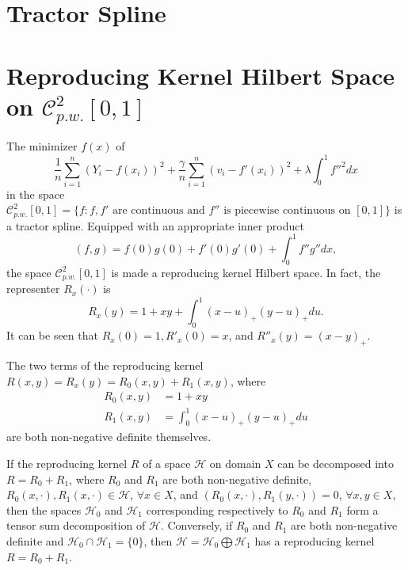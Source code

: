 \section{Tractor Spline}


\section{Reproducing Kernel Hilbert Space on $\mathcal{C}_{p.w.}^{2}[0,1]$}
The minimizer $f(x)$ of
\begin{equation}\label{maineq}
\frac{1}{n}\sum_{i=1}^{n}(Y_i-f(x_i))^2+\frac{\gamma}{n}\sum_{i=1}^{n}(v_i-f'(x_i))^2+\lambda \int_{0}^{1}f''^2dx
\end{equation}
in the space $\mathcal{C}_{p.w.}^{2}[0,1]=\{f:f,f' \mbox{ are continuous and } f'' \mbox{ is piecewise continuous on } [0,1] \}$ is a tractor spline. Equipped with an appropriate inner product
\begin{equation}
(f,g)=f(0) g(0)+f'(0) g'(0)+\int_{0}^{1}f''g''dx,
\end{equation}
the space $\mathcal{C}_{p.w.}^{2}[0,1]$ is made a reproducing kernel Hilbert space. In fact, the representer $R_x(\cdot)$ is 
\begin{equation}\label{kerneleq}
R_x(y)=1+xy+\int_{0}^{1} (x-u)_+(y-u)_+du.
\end{equation}
It can be seen that $R_x(0)=1, R'_x(0)=x$, and $R''_x(y)=(x-y)_+$.

The two terms of the reproducing kernel $R(x,y)=R_x(y)=R_0(x,y)+R_1(x,y)$, where
\begin{align}
R_0(x,y)&=1+xy \\
R_1(x,y)&=\int_{0}^{1} (x-u)_+(y-u)_+du
\end{align}
are both non-negative definite themselves.

\begin{theorem}
If the reproducing kernel $R$ of a space $\mathcal{H}$ on domain $X$ can be decomposed into $R = R_0+R_1$, where $R_0$ and $R_1$ are both non-negative definite, $R_0(x,\cdot), R_1(x,\cdot) \in \mathcal{H}$, $\forall x \in X$, and $(R_0(x, ·),R_1(y, ·)) = 0$, $\forall x, y \in X$, then the spaces $\mathcal{H}_0$ and $\mathcal{H}_1$ corresponding respectively to $R_0$ and $R_1$ form a tensor sum decomposition of $\mathcal{H}$. Conversely, if $R_0$ and $R_1$ are both non-negative definite and $\mathcal{H}_0 \cap \mathcal{H}_1 = \{ 0 \}$, then $\mathcal{H} = \mathcal{H}_0 \bigoplus \mathcal{H}_1$ has a reproducing kernel $R = R_0 + R_1$.
\end{theorem}

